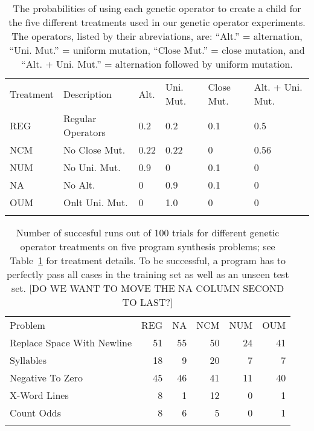 \begin{table}
\centering
\caption{The probabilities of using each genetic operator to create a child for the five different treatments used in our genetic operator experiments. The operators, listed by their abreviations, are:
``Alt.'' = alternation,
``Uni. Mut.'' = uniform mutation,
``Close Mut.'' = close mutation, and
``Alt. + Uni. Mut.'' = alternation followed by uniform mutation.}
\label{genetic-operator-combinations}
\begin{tabular}{ll llll}
\hline\noalign{\smallskip}
Treatment & Description & Alt. & Uni. Mut. & Close Mut. & Alt. + Uni. Mut. \\
\noalign{\smallskip}\svhline\noalign{\smallskip}
REG & Regular Operators &  0.2 &  0.2 &  0.1 &  0.5  \\
NCM & No Close Mut.  &  0.22 &  0.22 &  0 &  0.56  \\
NUM & No Uni. Mut. &  0.9 &  0 &  0.1 &  0  \\
NA  & No Alt. &  0 &  0.9 &  0.1 &  0  \\
OUM & Onlt Uni. Mut. &  0 &  1.0 &  0 &  0  \\
\noalign{\smallskip}\hline\noalign{\smallskip}
\end{tabular}
\end{table}

\begin{table}
\centering
\label{genetic-operator-results}
\caption{Number of succesful runs out of 100 trials for different genetic operator treatments on five program synthesis problems; see Table~\ref{genetic-operator-combinations} for treatment details. To be successful, a program has to perfectly pass all cases in the training set as well as an unseen test set. [DO WE WANT TO MOVE THE NA COLUMN SECOND TO LAST?]}
\begin{tabular}{l r r r r r}
\hline\noalign{\smallskip}
Problem                    & REG & NA & NCM & NUM & OUM \\
\noalign{\smallskip}\svhline\noalign{\smallskip}
Replace Space With Newline &  51 & 55 &  50 &  24 &  41 \\
Syllables                  &  18 &  9 &  20 &   7 &   7 \\
Negative To Zero           &  45 & 46 &  41 &  11 &  40 \\
X-Word Lines               &   8 &  1 &  12 &   0 &   1 \\
Count Odds                 &   8 &  6 &   5 &   0 &   1 \\
\noalign{\smallskip}\hline\noalign{\smallskip}
\end{tabular}
\end{table}

